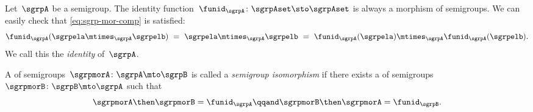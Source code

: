 \begin{ctdefinition}
  \label{def:identity-sgrp-mor}
  Let~$\sgrpA$ be a semigroup.
  The identity function~$\funid_\sgrpA\colon \sgrpAset \sto \sgrpAset$ is always a morphism of semigroups.
  We can easily check that \cref{eq:sgrp-mor-comp} is satisfied:
  \begin{equation}\label{eq:identity-sgrp-mor-proof}
    \funid_\sgrpA (\sgrpela \mtimes_{\sgrpA} \sgrpelb) \ = \  \sgrpela \mtimes_{\sgrpA} \sgrpelb
     \ = \
    \funid_\sgrpA (\sgrpela )\mtimes_{\sgrpA}\funid_\sgrpA(\sgrpelb).
  \end{equation}
%
  We call this the \emph{identity \whomo} of~$\sgrpA$.
\end{ctdefinition}
\devel{%
\begin{forslides}
\begin{equation}\label{eq:identity-sgrp}
\funid_\sgrpA\colon \sgrpAset \sto \sgrpAset
\end{equation}
\end{forslides}
}%


\begin{ctdefinition}
  \label{def:semigroup-iso}
  A \whomo of semigroups~$\sgrpmorA\colon \sgrpA \mto \sgrpB$ is called a \emph{semigroup isomorphism} if there exists a \whomo of semigroups~$\sgrpmorB\colon \sgrpB \mto \sgrpA$ such that
  \begin{equation}
    \label{eq:sgrp-iso-cond}
    \sgrpmorA \then \sgrpmorB = \funid_\sgrpA  \qqand \sgrpmorB \then \sgrpmorA = \funid_\sgrpB.
  \end{equation}
\end{ctdefinition}

